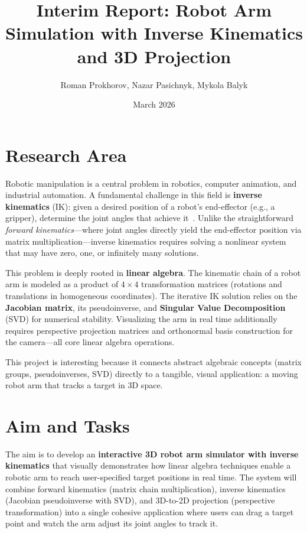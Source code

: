 \documentclass[11pt]{article}
\title{Interim Report: Robot Arm Simulation with Inverse Kinematics and 3D Projection}
\author{Roman Prokhorov, Nazar Pasichnyk, Mykola Balyk}
\date{March 2026}
\begin{document}
\maketitle

\section{Research Area}

Robotic manipulation is a central problem in robotics, computer animation, and industrial automation. A fundamental challenge in this field is \textbf{inverse kinematics} (IK): given a desired position of a robot's end-effector (e.g., a gripper), determine the joint angles that achieve it~\cite{mathworks}. Unlike the straightforward \textit{forward kinematics}---where joint angles directly yield the end-effector position via matrix multiplication---inverse kinematics requires solving a nonlinear system that may have zero, one, or infinitely many solutions.

This problem is deeply rooted in \textbf{linear algebra}. The kinematic chain of a robot arm is modeled as a product of $4 \times 4$ transformation matrices (rotations and translations in homogeneous coordinates). The iterative IK solution relies on the \textbf{Jacobian matrix}, its pseudoinverse, and \textbf{Singular Value Decomposition} (SVD) for numerical stability. Visualizing the arm in real time additionally requires perspective projection matrices and orthonormal basis construction for the camera---all core linear algebra operations.

This project is interesting because it connects abstract algebraic concepts (matrix groups, pseudoinverses, SVD) directly to a tangible, visual application: a moving robot arm that tracks a target in 3D space.

\section{Aim and Tasks}

The aim is to develop an \textbf{interactive 3D robot arm simulator with inverse kinematics} that visually demonstrates how linear algebra techniques enable a robotic arm to reach user-specified target positions in real time. The system will combine forward kinematics (matrix chain multiplication), inverse kinematics (Jacobian pseudoinverse with SVD), and 3D-to-2D projection (perspective transformation) into a single cohesive application where users can drag a target point and watch the arm adjust its joint angles to track it.
\end{document}
